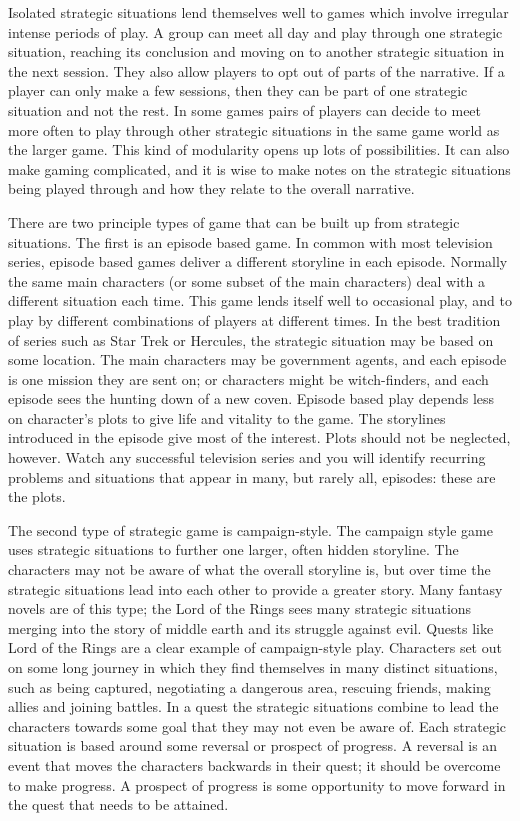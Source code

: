 \documentclass[twoside]{book}
\begin{document}
Isolated strategic situations lend themselves well to games which
involve irregular intense periods of play. A group can meet all day
and play through one strategic situation, reaching its conclusion and
moving on to another strategic situation in the next session. They
also allow players to opt out of parts of the narrative. If a player
can only make a few sessions, then they can be part of one strategic
situation and not the rest. In some games pairs of players can decide
to meet more often to play through other strategic situations in the
same game world as the larger game. This kind of modularity opens up
lots of possibilities. It can also make gaming complicated, and it is
wise to make notes on the strategic situations being played through
and how they relate to the overall narrative.

There are two principle types of game that can be built up from
strategic situations. The first is an episode based game. In common
with most television series, episode based games deliver a different
storyline in each episode. Normally the same main characters (or some
subset of the main characters) deal with a different situation each
time. This game lends itself well to occasional play, and to play by
different combinations of players at different times. In the best
tradition of series such as Star Trek or Hercules, the strategic
situation may be based on some location. The main characters may be
government agents, and each episode is one mission they are sent on;
or characters might be witch-finders, and each episode sees the
hunting down of a new coven. Episode based play depends less on
character's plots to give life and vitality to the game. The
storylines introduced in the episode give most of the interest. Plots
should not be neglected, however. Watch any successful television
series and you will identify recurring problems and situations that
appear in many, but rarely all, episodes: these are the plots.

The second type of strategic game is campaign-style. The campaign
style game uses strategic situations to further one larger, often
hidden storyline. The characters may not be aware of what the overall
storyline is, but over time the strategic situations lead into each
other to provide a greater story. Many fantasy novels are of this
type; the Lord of the Rings sees many strategic situations merging
into the story of middle earth and its struggle against evil. Quests
like Lord of the Rings are a clear example of campaign-style
play. Characters set out on some long journey in which they find
themselves in many distinct situations, such as being captured,
negotiating a dangerous area, rescuing friends, making allies and
joining battles. In a quest the strategic situations combine to lead
the characters towards some goal that they may not even be aware
of. Each strategic situation is based around some reversal or prospect
of progress. A reversal is an event that moves the characters
backwards in their quest; it should be overcome to make progress. A
prospect of progress is some opportunity to move forward in the quest
that needs to be attained.
\end{document}
